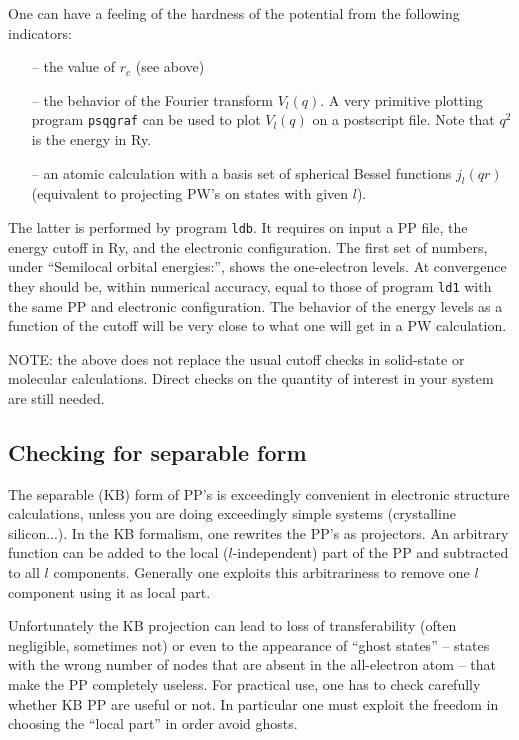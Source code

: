 One can have a feeling of the hardness of the potential from the
following indicators:
\begin{enumerate}
\item[--] the value of $r_c$ (see above)
\item[--] the behavior of the Fourier transform $V_l(q)$. A very
          primitive plotting program {\tt psqgraf} can be used to plot
          $V_l(q)$ on a postscript file. Note that $q^2$ is the energy
          in Ry.
\item[--] an atomic calculation with a basis set of spherical 
          Bessel functions $j_l(qr)$ (equivalent to projecting PW's
          on states with given $l$).
\end{enumerate}
The latter is performed by program {\tt ldb}. It requires on input
a PP file, the energy cutoff in Ry, and the electronic configuration.
The first set of
numbers, under ``Semilocal orbital energies:'', shows the one-electron
levels. At convergence they should be, within numerical accuracy,
equal to those of program {\tt ld1} with the same PP and electronic
configuration. The behavior of the energy levels as a function of the
cutoff will be very close to what one will get in a PW calculation.

NOTE: the above does not replace the usual cutoff checks in
solid-state or molecular calculations. Direct checks on the quantity
of interest in your system are still needed.

\subsection{Checking for separable form}

The separable (KB) form of PP's is exceedingly convenient in
electronic structure calculations, unless you are doing exceedingly
simple systems (crystalline silicon...). In the KB formalism, one
rewrites the PP's as projectors. An arbitrary function can be
added to the local ($l$-independent) part of the PP and subtracted to
all $l$ components. Generally one exploits this arbitrariness to
remove one $l$ component using it as local part.

Unfortunately the KB projection can lead to loss of transferability
(often negligible, sometimes not) or even to the appearance of
``ghost states'' -- states with the wrong number of nodes that are
absent in the all-electron atom -- that make the PP completely
useless.  For practical use, one has to check
carefully whether KB PP are useful or not. In particular one must
exploit the freedom in choosing the ``local part'' in order avoid
ghosts.

